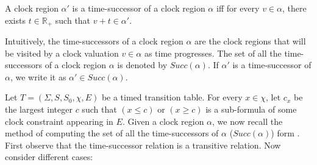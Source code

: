 \begin{definition}
A clock region $\alpha'$ is a time-successor of a clock region $\alpha$ iff for every $v \in \alpha$, there exists $t \in \mathbb{R}_{+}$ such that $v + t \in \alpha'$.
\end{definition}

Intuitively, the time-successors of a clock region $\alpha$ are the clock regions that will be visited by a clock valuation $v \in \alpha$ as time progresses. The set of all the time-successors of a clock region $\alpha$ is denoted by $Succ(\alpha)$. If $\alpha'$ is a time-successor of $\alpha$, we write it as $\alpha' \in Succ(\alpha)$.

Let $T = (\Sigma, S, S_{0}, \chi, E)$ be a timed transition table. For every $x \in \chi$, let $c_{x}$ be the largest integer $c$ such that $(x \leq c)$ or $(x \geq c)$ is a sub-formula of some clock constraint appearing in $E$. Given a clock region $\alpha$, we now recall the method of computing the set of all the time-successors of $\alpha$ ($Succ(\alpha)$) form \cite{1}. First observe that the time-successor relation is a transitive relation. Now consider different cases:
